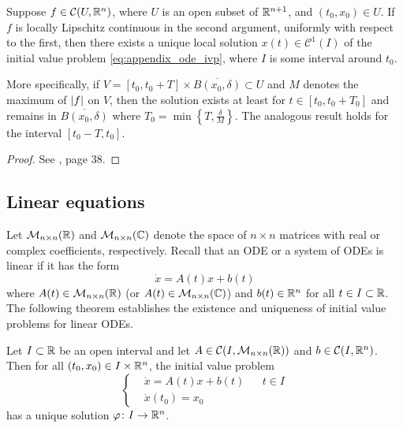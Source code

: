 \begin{theorem}
	\label{teo:picard_lindelof} Suppose $f \in \mathcal{C}(U, \mathbb{R}^n)$, where
	$U$ is an open subset of $\mathbb{R}^{n+1}$, and $(t_0, x_0) \in U$. If $f$
	is locally Lipschitz continuous in the second argument, uniformly with
	respect to the first, then there exists a unique local solution $x(t)
	\in \mathcal{C}^1(I)$ of the initial value problem
	\eqref{eq:appendix_ode_ivp}, where $I$ is some interval around $t_0$. 
	
	More specifically, if $V = [t_0, t_0 + T] \times \overline{B(x_0,
	\delta)} \subset U$ and $M$ denotes the maximum of $\abs{f}$ on $V$, then
	the solution exists at least for $t \in [t_0, t_0 + T_0]$ and remains in
	$\overline{B(x_0, \delta)}$ where $T_0 = \min{\left\{ T,
	\frac{\delta}{M} \right\}}$. The analogous result holds for the interval
	$[t_0 - T, t_0]$.
\end{theorem}
\begin{proof}
	See \cite{teschl2012odes}, page 38.
\end{proof}


\subsection{Linear equations}

Let $\mathcal{M}_{n \times n}(\mathbb{R})$ and $\mathcal{M}_{n \times n}(\mathbb{C})$
denote the space of $n \times n$ matrices with real or complex coefficients,
respectively. Recall that an ODE or a system of ODEs is linear if it has the
form
\begin{equation} \label{eq:linear_ode}
	\dot{x} = A(t) x + b(t)
\end{equation}
where $A(t) \in \mathcal{M}_{n \times n}(\mathbb{R})$ (or $A(t) \in \mathcal{M}_{n
\times n}(\mathbb{C})$) and $b(t) \in \mathbb{R}^n$ for all $t \in I \subset \mathbb{R}$. The
following theorem establishes the existence and uniqueness of initial value
problems for linear ODEs.

\begin{theorem} \label{teo:linear_ode}
	Let $I \subset \mathbb{R}$ be an open interval and let $A \in \mathcal{C}(I,
	\mathcal{M}_{n \times n}(\mathbb{R}))$ and $b \in \mathcal{C}(I, \mathbb{R}^n)$. Then
	for all $(t_0, x_0) \in I \times \mathbb{R}^n$, the initial value problem
	\begin{equation*}
		\left\{
			\begin{aligned}
				&\dot{x} = A(t) x + b(t) & &t \in I \\
				&\dot{x}(t_0) = x_0
			\end{aligned}
		\right.
	\end{equation*}
	has a unique solution $\varphi \colon I \rightarrow \mathbb{R}^n$.
\end{theorem}

